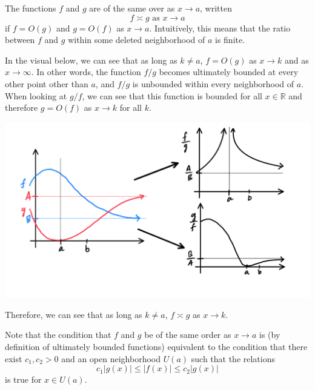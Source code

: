 \documentclass{article}
\begin{document}
    \begin{definition}
      The functions $f$ and $g$ are of the same over as $x \rightarrow a$, written 
      \[f \asymp g \text{ as } x \rightarrow a\]
      if $f = O(g)$ and $g = O(f)$ as $x \rightarrow a$. Intuitively, this means that the ratio between $f$ and $g$ within some deleted neighborhood of $a$ is finite. 

      In the visual below, we can see that as long as $k \neq a$, $f = O(g)$ as $x \rightarrow k$ and as $x \rightarrow \infty$. In other words, the function $f/g$ becomes ultimately bounded at every other point other than $a$, and $f/g$ is unbounded within every neighborhood of $a$. When looking at $g/f$, we can see that this function is bounded for all $x \in \mathbb{R}$ and therefore $g = O(f)$ as $x \rightarrow k$ for all $k$. 
      \begin{center}
          \includegraphics[scale=0.25]{img/Functions_of_Same_Order.PNG}
      \end{center}
      Therefore, we can see that as long as $k \neq a$, $f \asymp g$ as $x \rightarrow k$.

      Note that the condition that $f$ and $g$ be of the same order as $x \rightarrow a$ is (by definition of ultimately bounded functions) equivalent to the condition that there exist $c_1, c_2 > 0$ and an open neighborhood $U (a)$ such that the relations
      \[c_1 |g(x)| \leq |f(x)| \leq c_2 |g(x)|\]
      is true for $x \in U(a)$. 
    \end{definition}
\end{document}
